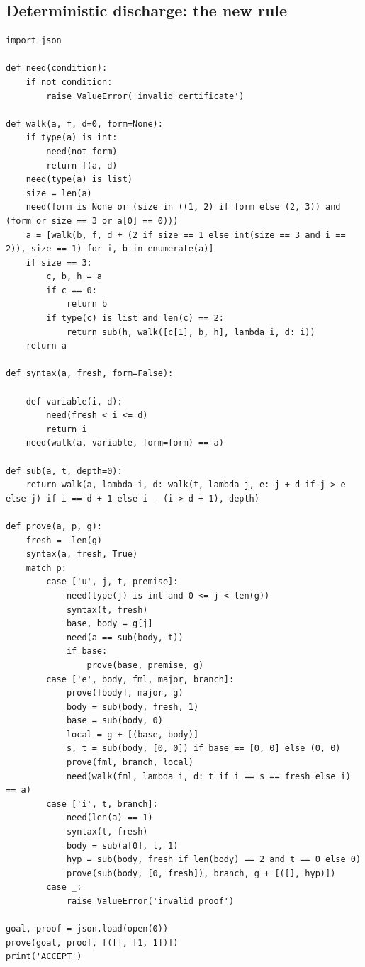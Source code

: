 \documentclass[11pt,letterpaper]{article}
\theoremstyle{definition}\newtheorem{definition}[theorem]{Definition}
\theoremstyle{remark}\newtheorem{remark}[theorem]{Remark}
\begin{document}
\subsection{Deterministic discharge: the new rule}
\begin{lstlisting}
import json

def need(condition):
    if not condition:
        raise ValueError('invalid certificate')

def walk(a, f, d=0, form=None):
    if type(a) is int:
        need(not form)
        return f(a, d)
    need(type(a) is list)
    size = len(a)
    need(form is None or (size in ((1, 2) if form else (2, 3)) and (form or size == 3 or a[0] == 0)))
    a = [walk(b, f, d + (2 if size == 1 else int(size == 3 and i == 2)), size == 1) for i, b in enumerate(a)]
    if size == 3:
        c, b, h = a
        if c == 0:
            return b
        if type(c) is list and len(c) == 2:
            return sub(h, walk([c[1], b, h], lambda i, d: i))
    return a

def syntax(a, fresh, form=False):

    def variable(i, d):
        need(fresh < i <= d)
        return i
    need(walk(a, variable, form=form) == a)

def sub(a, t, depth=0):
    return walk(a, lambda i, d: walk(t, lambda j, e: j + d if j > e else j) if i == d + 1 else i - (i > d + 1), depth)

def prove(a, p, g):
    fresh = -len(g)
    syntax(a, fresh, True)
    match p:
        case ['u', j, t, premise]:
            need(type(j) is int and 0 <= j < len(g))
            syntax(t, fresh)
            base, body = g[j]
            need(a == sub(body, t))
            if base:
                prove(base, premise, g)
        case ['e', body, fml, major, branch]:
            prove([body], major, g)
            body = sub(body, fresh, 1)
            base = sub(body, 0)
            local = g + [(base, body)]
            s, t = sub(body, [0, 0]) if base == [0, 0] else (0, 0)
            prove(fml, branch, local)
            need(walk(fml, lambda i, d: t if i == s == fresh else i) == a)
        case ['i', t, branch]:
            need(len(a) == 1)
            syntax(t, fresh)
            body = sub(a[0], t, 1)
            hyp = sub(body, fresh if len(body) == 2 and t == 0 else 0)
            prove(sub(body, [0, fresh]), branch, g + [([], hyp)])
        case _:
            raise ValueError('invalid proof')

goal, proof = json.load(open(0))
prove(goal, proof, [([], [1, 1])])
print('ACCEPT')
\end{lstlisting}
\end{document}

